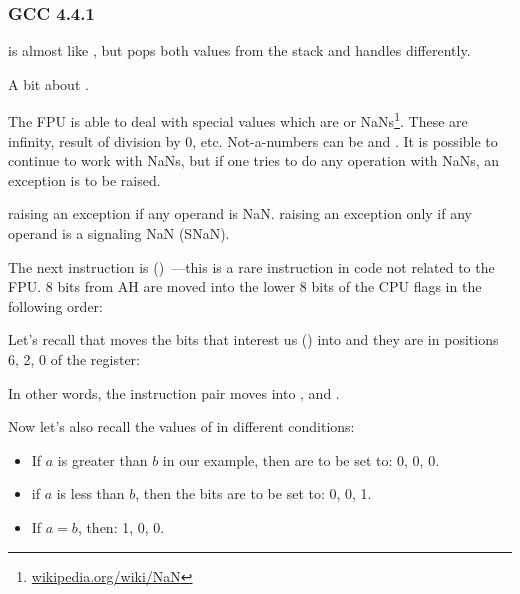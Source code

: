 \ifdefined\IncludeGCC
\subsubsection{GCC 4.4.1}




\FUCOMPP{} is almost like \FCOM, but pops both values from the stack and handles
 differently.

A bit about .

\newcommand{\NANFN}{\footnote{\href{http://go.yurichev.com/17130}{wikipedia.org/wiki/NaN}}}

The FPU is able to deal with special values which are  or \gls{NaN}s\NANFN. 
These are infinity, result of division by 0, etc. 
Not-a-numbers can be  and . It is possible to continue to work with  NaNs, 
but if one tries to do any operation with  NaNs, an exception is to be raised.


\FCOM raising an exception if any operand is \gls{NaN}. 
\FUCOM raising an exception only if any operand is a signaling \gls{NaN} (SNaN).

\label{SAHF}

The next instruction is \SAHF ()~---this is a rare 
instruction in code not related to the FPU. 
8 bits from AH are moved into the lower 8 bits of the CPU flags in the following order:




Let's recall that \FNSTSW moves the bits that interest us (\CThreeBits) into \AH 
and they are in positions 6, 2, 0 of the \AH register:



In other words, the  instruction pair moves \CThreeBits into \ZF, \PF and \CF.

Now let's also recall the values of \CThreeBits in different conditions:

\begin{itemize}
\item If $a$ is greater than $b$ in our example, then \CThreeBits are to be set to: 0, 0, 0.
\item if $a$ is less than $b$, then the bits are to be set to: 0, 0, 1.
\item If $a=b$, then: 1, 0, 0.
\end{itemize}

